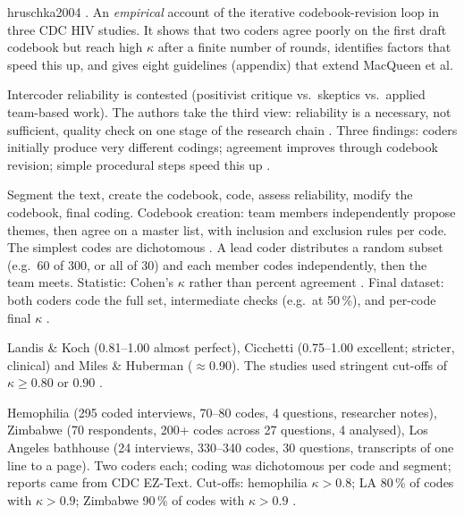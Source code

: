 \begin{papercard}{hruschka2004}
  . An \emph{empirical} account of the iterative codebook-revision loop in three CDC HIV studies. It shows that two coders agree poorly on the first draft codebook but reach high $\kappa$ after a finite number of rounds, identifies factors that speed this up, and gives eight guidelines (appendix) that extend MacQueen et al.

 Intercoder reliability is contested (positivist critique vs.\ skeptics vs.\ applied team-based work). The authors take the third view: reliability is a necessary, not sufficient, quality check on one stage of the research chain . Three findings: coders initially produce very different codings; agreement improves through codebook revision; simple procedural steps speed this up .

 Segment the text, create the codebook, code, assess reliability, modify the codebook, final coding. Codebook creation: team members independently propose themes, then agree on a master list, with inclusion and exclusion rules per code. The simplest codes are dichotomous . A lead coder distributes a random subset (e.g.\ 60 of 300, or all of 30) and each member codes independently, then the team meets. Statistic: Cohen's $\kappa$ rather than percent agreement . Final dataset: both coders code the full set, intermediate checks (e.g.\ at 50\,\%), and per-code final $\kappa$ .

 Landis \& Koch (0.81--1.00 almost perfect), Cicchetti (0.75--1.00 excellent; stricter, clinical) and Miles \& Huberman ($\approx$0.90). The studies used stringent cut-offs of $\kappa\ge0.80$ or $0.90$ .

 Hemophilia (295 coded interviews, 70--80 codes, 4 questions, researcher notes), Zimbabwe (70 respondents, 200+ codes across 27 questions, 4 analysed), Los Angeles bathhouse (24 interviews, 330--340 codes, 30 questions, transcripts of one line to a page). Two coders each; coding was dichotomous per code and segment; reports came from CDC EZ-Text. Cut-offs: hemophilia $\kappa>0.8$; LA 80\,\% of codes with $\kappa>0.9$; Zimbabwe 90\,\% of codes with $\kappa>0.9$ .


\end{papercard}
